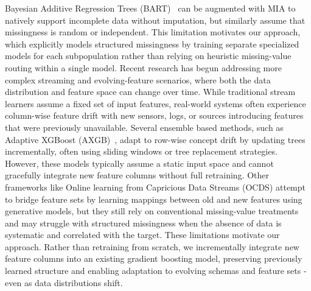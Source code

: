 \documentclass[sigconf]{acmart}
\begin{document}
\begin{itemize}
Bayesian Additive Regression Trees (BART)~\cite{chipman2010bart} can be augmented with MIA to natively support incomplete data without imputation, but similarly assume that missingness is random or independent. This limitation motivates our approach, which explicitly models structured missingness by training separate specialized models for each subpopulation rather than relying on heuristic missing-value routing within a single model.
Recent research has begun addressing more complex streaming and evolving-feature scenarios, where both the data distribution and feature space can change over time. While traditional stream learners assume a fixed set of input features, real-world systems often experience column-wise feature drift with new sensors, logs, or sources introducing features that were previously unavailable.
Several ensemble based methods, such as Adaptive XGBoost (AXGB)~\cite{montiel2020axgb}, adapt to row-wise concept drift by updating trees incrementally, often using sliding windows or tree replacement strategies. However, these models typically assume a static input space and cannot gracefully integrate new feature columns without full retraining. Other frameworks like Online learning from Capricious Data Streams (OCDS) \cite{he2019ocds} attempt to bridge feature sets by learning mappings between old and new features using generative models, but they still rely on conventional missing-value treatments and may struggle with structured missingness when the absence of data is systematic and correlated with the target. These limitations motivate our approach. Rather than retraining from scratch, we incrementally integrate new feature columns into an existing gradient boosting model, preserving previously learned structure and enabling adaptation to evolving schemas and feature sets - even as data distributions shift.


\end{itemize}
\end{document}
